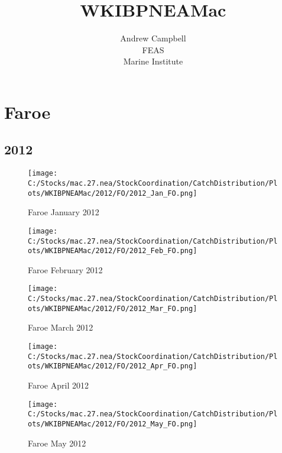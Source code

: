 \documentclass{article}
\begin{document}
\title{WKIBPNEAMac}
\author{Andrew Campbell \\ FEAS \\ Marine Institute}
\maketitle

\tableofcontents

\section{Faroe}



\newpage

\subsection{2012}



\begin{figure}[h]
	\centering
		\texttt{[image: C:/Stocks/mac.27.nea/StockCoordination/CatchDistribution/Plots/WKIBPNEAMac/2012/FO/2012\_Jan\_FO.png]}
	\caption{Faroe January 2012}
	\label{fig:2012_Jan_FO}
\end{figure}

\begin{figure}
	\centering
		\texttt{[image: C:/Stocks/mac.27.nea/StockCoordination/CatchDistribution/Plots/WKIBPNEAMac/2012/FO/2012\_Feb\_FO.png]}
	\caption{Faroe February 2012}
	\label{fig:2012_Feb_FO}
\end{figure}

\begin{figure}
	\centering
		\texttt{[image: C:/Stocks/mac.27.nea/StockCoordination/CatchDistribution/Plots/WKIBPNEAMac/2012/FO/2012\_Mar\_FO.png]}
	\caption{Faroe March 2012}
	\label{fig:2012_Mar_FO}
\end{figure}

\begin{figure}
	\centering
		\texttt{[image: C:/Stocks/mac.27.nea/StockCoordination/CatchDistribution/Plots/WKIBPNEAMac/2012/FO/2012\_Apr\_FO.png]}
	\caption{Faroe April 2012}
	\label{fig:2012_Apr_FO}
\end{figure}

\begin{figure}
	\centering
		\texttt{[image: C:/Stocks/mac.27.nea/StockCoordination/CatchDistribution/Plots/WKIBPNEAMac/2012/FO/2012\_May\_FO.png]}
	\caption{Faroe May 2012}
	\label{fig:2012_May_FO}
\end{figure}
\end{document}
